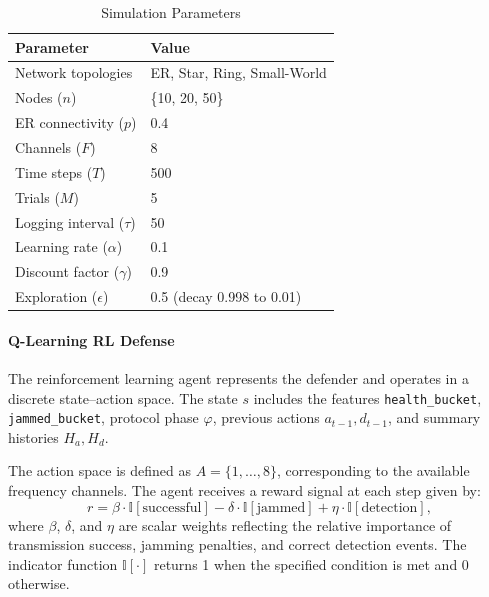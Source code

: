 \documentclass[conference]{IEEEtran}
\begin{document}
\begin{table}[h]
\centering
\caption{Simulation Parameters}
\label{tab:params}
\begin{tabular}{@{}ll@{}}
\toprule
Parameter                    & Value                          \\ \midrule
Network topologies           & ER, Star, Ring, Small-World    \\
Nodes ($n$)                  & \{10, 20, 50\}                 \\
ER connectivity ($p$)        & 0.4                            \\
Channels ($F$)               & 8                              \\
Time steps ($T$)             & 500                            \\
Trials ($M$)                 & 5                              \\
Logging interval ($\tau$)    & 50                             \\
Learning rate ($\alpha$)     & 0.1                            \\
Discount factor ($\gamma$)   & 0.9                            \\
Exploration ($\epsilon$)     & 0.5 (decay 0.998 to 0.01)      \\
\bottomrule
\end{tabular}
\end{table}

\paragraph{Q-Learning RL Defense}
The reinforcement learning agent represents the defender and operates in a discrete state–action space. The state $s$ includes the features \texttt{health\_bucket}, \texttt{jammed\_bucket}, protocol phase $\varphi$, previous actions $a_{t-1}, d_{t-1}$, and summary histories $H_a, H_d$.

The action space is defined as $A = \{1, \ldots, 8\}$, corresponding to the available frequency channels. The agent receives a reward signal at each step given by:
\[
r = \beta \cdot \mathbb{I}[\text{successful}] - \delta \cdot \mathbb{I}[\text{jammed}] + \eta \cdot \mathbb{I}[\text{detection}],
\]
where $\beta$, $\delta$, and $\eta$ are scalar weights reflecting the relative importance of transmission success, jamming penalties, and correct detection events. The indicator function $\mathbb{I}[\cdot]$ returns 1 when the specified condition is met and 0 otherwise.
\end{document}
